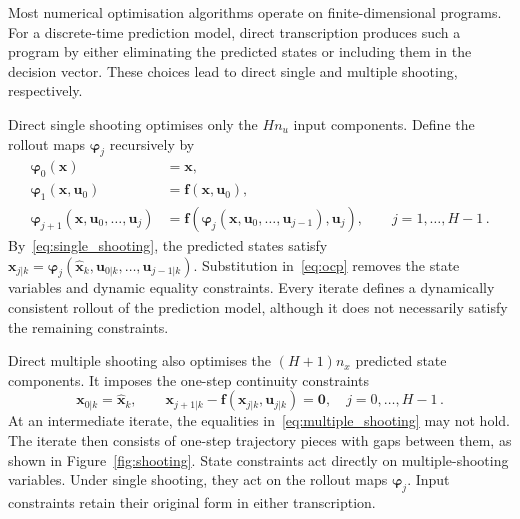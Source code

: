 Most numerical optimisation algorithms operate on finite-dimensional programs. For a
discrete-time prediction model, direct transcription produces such a program by either
eliminating the predicted states or including them in the decision vector. These choices
lead to direct single and multiple shooting, respectively.

Direct single shooting optimises only the $H n_u$ input components. Define the rollout maps
$\boldsymbol{\varphi}_j$ recursively by
%
\begin{align}
    \boldsymbol{\varphi}_0(\mathbf{x})
    &= \mathbf{x}, \nonumber \\
    \boldsymbol{\varphi}_1(\mathbf{x}, \mathbf{u}_0)
    &= \mathbf{f}(\mathbf{x}, \mathbf{u}_0), \nonumber \\
    \boldsymbol{\varphi}_{j+1}(\mathbf{x}, \mathbf{u}_0, \dots, \mathbf{u}_j)
    &= \mathbf{f}\!\left(
       \boldsymbol{\varphi}_j(\mathbf{x}, \mathbf{u}_0, \dots, \mathbf{u}_{j-1}),
       \mathbf{u}_j\right),
       \qquad j = 1, \dots, H-1 \,. \label{eq:single_shooting}
\end{align}
%
By~\eqref{eq:single_shooting}, the predicted states satisfy
$\mathbf{x}_{j|k} = \boldsymbol{\varphi}_j(\hat{\mathbf{x}}_k,
\mathbf{u}_{0|k}, \dots, \mathbf{u}_{j-1|k})$. Substitution in~\eqref{eq:ocp} removes the
state variables and dynamic equality constraints. Every iterate defines a dynamically
consistent rollout of the prediction model, although it does not necessarily satisfy the remaining
constraints.

Direct multiple shooting also optimises the $(H+1)n_x$ predicted state components. It %
imposes the one-step continuity constraints~\cite{Bock1984} %
%
\begin{equation}
    \mathbf{x}_{0|k} = \hat{\mathbf{x}}_k, \qquad
    \mathbf{x}_{j+1|k} - \mathbf{f}\!\left(\mathbf{x}_{j|k}, \mathbf{u}_{j|k}\right)
    = \mathbf{0},
    \quad j = 0, \dots, H-1 \,. \label{eq:multiple_shooting}
\end{equation}
%
At an intermediate iterate, the equalities in~\eqref{eq:multiple_shooting} may not hold.
The iterate then consists of
one-step trajectory pieces with gaps between them, as shown in Figure~\ref{fig:shooting}.
State constraints act directly on multiple-shooting variables. Under single shooting, they
act on the rollout maps $\boldsymbol{\varphi}_j$. Input constraints retain their original
form in either transcription.

